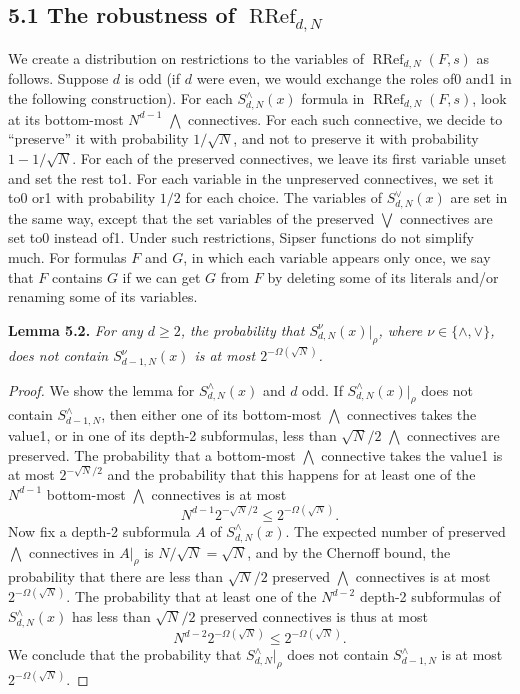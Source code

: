 \documentclass[10pt,a4paper]{article}
\newcommand{\RRef}{\operatorname{RRef}}
\newenvironment{originalresult}[1]{\par\medskip\noindent\textbf{#1.}\itshape}{\par\medskip}
\begin{document}
\subsection*{5.1 The robustness of $\RRef_{d,N}$}
We create a distribution on restrictions to the variables of $\RRef_{d,N}(F,s)$ as follows. Suppose $d$ is odd (if $d$ were even, we would exchange the roles of0 and1 in the following construction). For each $S_{d,N}^{\wedge}(x)$ formula in $\RRef_{d,N}(F,s)$, look at its bottom-most $N^{d-1}$ $\bigwedge$ connectives. For each such connective, we decide to ``preserve'' it with probability $1/\sqrt N$, and not to preserve it with probability $1-1/\sqrt N$. For each of the preserved connectives, we leave its first variable unset and set the rest to1. For each variable in the unpreserved connectives, we set it to0 or1 with probability $1/2$ for each choice. The variables of $S_{d,N}^{\vee}(x)$ are set in the same way, except that the set variables of the preserved $\bigvee$ connectives are set to0 instead of1.
Under such restrictions, Sipser functions do not simplify much. For formulas $F$ and $G$, in which each variable appears only once, we say that $F$ contains $G$ if we can get $G$ from $F$ by deleting some of its literals and/or renaming some of its variables.
\begin{originalresult}{Lemma 5.2}
For any $d\ge2$, the probability that $S_{d,N}^{\nu}(x)|_\rho$, where $\nu\in\{\wedge,\vee\}$, does not contain $S_{d-1,N}^{\nu}(x)$ is at most $2^{-\Omega(\sqrt N)}$.
\end{originalresult}
\begin{proof}
We show the lemma for $S_{d,N}^{\wedge}(x)$ and $d$ odd. If $S_{d,N}^{\wedge}(x)|_\rho$ does not contain $S_{d-1,N}^{\wedge}$, then either one of its bottom-most $\bigwedge$ connectives takes the value1, or in one of its depth-2 subformulas, less than $\sqrt N/2$ $\bigwedge$ connectives are preserved. The probability that a bottom-most $\bigwedge$ connective takes the value1 is at most $2^{-\sqrt N/2}$ and the probability that this happens for at least one of the $N^{d-1}$ bottom-most $\bigwedge$ connectives is at most
\[N^{d-1}2^{-\sqrt N/2}\le2^{-\Omega(\sqrt N)}.\]
Now fix a depth-2 subformula $A$ of $S_{d,N}^{\wedge}(x)$. The expected number of preserved $\bigwedge$ connectives in $A|_\rho$ is $N/\sqrt N=\sqrt N$, and by the Chernoff bound, the probability that there are less than $\sqrt N/2$ preserved $\bigwedge$ connectives is at most $2^{-\Omega(\sqrt N)}$. The probability that at least one of the $N^{d-2}$ depth-2 subformulas of $S_{d,N}^{\wedge}(x)$ has less than $\sqrt N/2$ preserved connectives is thus at most
\[N^{d-2}2^{-\Omega(\sqrt N)}\le2^{-\Omega(\sqrt N)}.\]
We conclude that the probability that $S_{d,N}^{\wedge}|_\rho$ does not contain $S_{d-1,N}^{\wedge}$ is at most $2^{-\Omega(\sqrt N)}$.
\end{proof}
\end{document}

